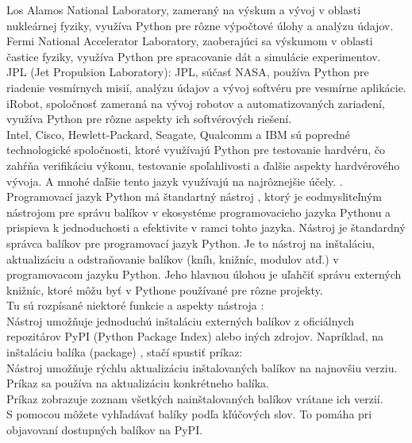 \tab[5 mm] Los Alamos National Laboratory, zameraný na výskum a vývoj v oblasti nukleárnej fyziky, využíva Python pre rôzne výpočtové úlohy a analýzu údajov.\\
\tab[5 mm] Fermi National Accelerator Laboratory, zaoberajúci sa výskumom v oblasti častice fyziky, využíva Python pre spracovanie dát a simulácie experimentov.\\
\tab[5 mm] JPL (Jet Propulsion Laboratory): JPL, súčasť NASA, používa Python pre riadenie vesmírnych misií, analýzu údajov a vývoj softvéru pre vesmírne aplikácie.\\
\tab[5 mm] iRobot, spoločnosť zameraná na vývoj robotov a automatizovaných zariadení, využíva Python pre rôzne aspekty ich softvérových riešení.\\
\tab[5 mm] Intel, Cisco, Hewlett-Packard, Seagate, Qualcomm a IBM sú popredné technologické spoločnosti, ktoré využívajú Python pre testovanie hardvéru, čo zahŕňa verifikáciu výkonu, testovanie spoľahlivosti a ďalšie aspekty hardvérového vývoja.
A mnohé daľšie tento jazyk využívajú na najrôznejšie účely.  
\cite{srinath2017python}. \\
\tab[5 mm] Programovací jazyk Python má štandartný nástroj , ktorý je eodmysliteľným nástrojom pre správu balíkov v ekosystéme programovacieho jazyka Pythonu a prispieva k jednoduchosti a efektivite v ramci tohto jazyka. Nástroj  je štandardný správca balíkov pre programovací jazyk Python. Je to nástroj na inštaláciu, aktualizáciu a odstraňovanie balíkov (kníh, knižníc, modulov atď.) v programovacom jazyku Python. Jeho hlavnou úlohou je uľahčiť správu externých knižníc, ktoré môžu byť v Pythone používané pre rôzne projekty. \\
\tab[5 mm] Tu sú rozpísané niektoré funkcie a aspekty nástroja : \\
\tab[5 mm] Nástroj  umožňuje jednoduchú inštaláciu externých balíkov z oficiálnych repozitárov PyPI (Python Package Index) alebo iných zdrojov. Napríklad, na inštaláciu balíka (package) , stačí spustiť príkaz: \\
\tab[5 mm] Nástroj  umožňuje rýchlu aktualizáciu inštalovaných balíkov na najnovšiu verziu. Príkaz  sa používa na aktualizáciu konkrétneho balíka.\\
\tab[5 mm] Príkaz  zobrazuje zoznam všetkých nainštalovaných balíkov vrátane ich verzií.\\
\tab[5 mm] S pomocou  môžete vyhľadávať balíky podľa kľúčových slov. To pomáha pri objavovaní dostupných balíkov na PyPI.\\

